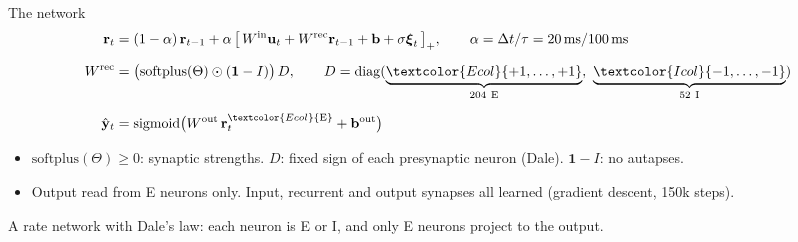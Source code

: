\documentclass[aspectratio=169]{beamer}
\newcommand{\takeaway}[1]{\par\vfill\noindent\colorbox{black!6}{\parbox{\dimexpr\linewidth-2\fboxsep\relax}{\small #1}}}
\begin{document}
\begin{frame}{The network}
  \small
  \begin{align*}
    \mathbf{r}_t &= (1-\alpha)\,\mathbf{r}_{t-1}
       + \alpha\,\big[\,W^{\mathrm{in}}\mathbf{u}_t + W^{\mathrm{rec}}\mathbf{r}_{t-1} + \mathbf{b} + \sigma\boldsymbol{\xi}_t\,\big]_+,
       \qquad \alpha = \Delta t/\tau = 20\,\text{ms}/100\,\text{ms}\\[0.6em]
    W^{\mathrm{rec}} &= \big(\mathrm{softplus}(\Theta)\odot(\mathbf{1}-I)\big)\,D,
       \qquad D = \mathrm{diag}(\underbrace{\textcolor{Ecol}{+1,\dots,+1}}_{204\ \text{E}},\
                                \underbrace{\textcolor{Icol}{-1,\dots,-1}}_{52\ \text{I}})\\[0.6em]
    \hat{\mathbf{y}}_t &= \mathrm{sigmoid}\big(W^{\mathrm{out}}\,\mathbf{r}^{\textcolor{Ecol}{\mathrm{E}}}_t + \mathbf{b}^{\mathrm{out}}\big)
  \end{align*}
  \footnotesize
  \begin{itemize}
    \item $\mathrm{softplus}(\Theta) \geq 0$: synaptic strengths. $D$: fixed sign of each presynaptic neuron (Dale).
          $\mathbf{1}-I$: no autapses.
    \item Output read from \textcolor{Ecol}{E} neurons only. Input, recurrent and output synapses all learned
          (gradient descent, 150k steps).
  \end{itemize}
  \takeaway{A rate network with Dale's law: each neuron is \textcolor{Ecol}{E} or \textcolor{Icol}{I}, and only
  \textcolor{Ecol}{E} neurons project to the output.}
\end{frame}
\end{document}

